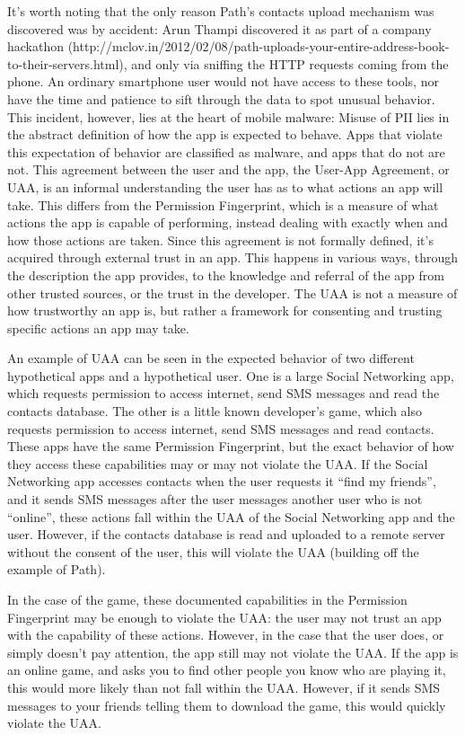It’s worth noting that the only reason Path’s contacts upload mechanism was discovered was by accident: Arun Thampi discovered it as part of a company hackathon (http://mclov.in/2012/02/08/path-uploads-your-entire-address-book-to-their-servers.html), and only via sniffing the HTTP requests coming from the phone. An ordinary smartphone user would not have access to these tools, nor have the time and patience to sift through the data to spot unusual behavior.
This incident, however, lies at the heart of mobile malware: Misuse of PII lies in the abstract definition of how the app is expected to behave. Apps that violate this expectation of behavior are classified as malware, and apps that do not are not. This agreement between the user and the app, the User-App Agreement, or UAA, is an informal understanding the user has as to what actions an app will take. This differs from the Permission Fingerprint, which is a measure of what actions the app is capable of performing, instead dealing with exactly when and how those actions are taken. Since this agreement is not formally defined, it’s acquired through external trust in an app. This happens in various ways, through the description the app provides, to the knowledge and referral of the app from other trusted sources, or the trust in the developer. The UAA is not a measure of how trustworthy an app is, but rather a framework for consenting and trusting specific actions an app may take.

An example of UAA can be seen in the expected behavior of two different hypothetical apps and a hypothetical user. One is a large Social Networking app, which requests permission to access internet, send SMS messages and read the contacts database. The other is a little known developer’s game, which also requests permission to access internet, send SMS messages and read contacts. These apps have the same Permission Fingerprint, but the exact behavior of how they access these capabilities may or may not violate the UAA. If the Social Networking app accesses contacts when the user requests it ``find my friends'', and it sends SMS messages after the user messages another user who is not ``online'', these actions fall within the UAA of the Social Networking app and the user. However, if the contacts database is read and uploaded to a remote server without the consent of the user, this will violate the UAA (building off the example of Path). 

In the case of the game, these documented capabilities in the Permission Fingerprint may be enough to violate the UAA: the user may not trust an app with the capability of these actions. However, in the case that the user does, or simply doesn’t pay attention, the app still may not violate the UAA. If the app is an online game, and asks you to find other people you know who are playing it, this would more likely than not fall within the UAA. However, if it sends SMS messages to your friends telling them to download the game, this would quickly violate the UAA.

